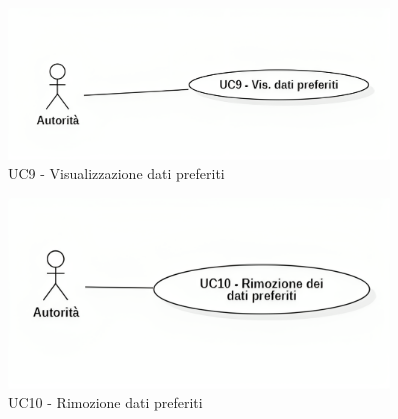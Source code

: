 





\begin{figure}[H]
    \centering
    \includegraphics[width=0.9\textwidth]{../Images/uc9.png}
    \caption{UC9 - Visualizzazione dati preferiti}
    \label{fig:UC9}
\end{figure}


\begin{figure}[H]
    \centering
    \includegraphics[width=0.9\textwidth]{../Images/uc10.png}
    \caption{UC10 - Rimozione dati preferiti}
    \label{fig:UC10}
\end{figure}


\setcounter{rowcounter}{1}
